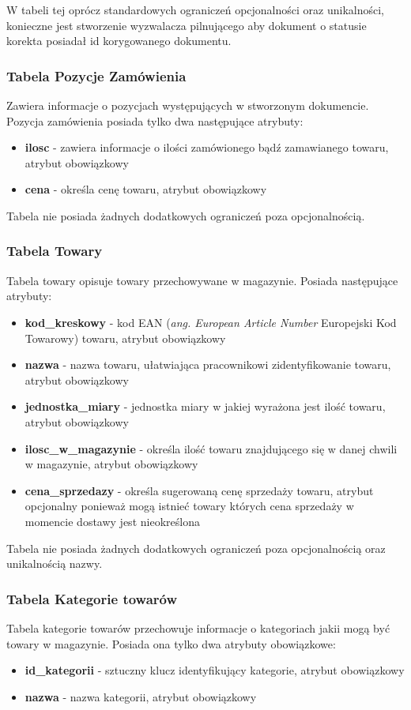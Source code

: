 W tabeli tej oprócz standardowych ograniczeń opcjonalności oraz unikalności,
konieczne jest stworzenie wyzwalacza pilnującego aby dokument o statusie korekta
posiadał id korygowanego dokumentu.

\subsubsection{Tabela Pozycje Zamówienia}
Zawiera informacje o pozycjach występujących w stworzonym dokumencie. Pozycja
zamówienia posiada tylko dwa następujące atrybuty:
\begin{itemize}
  \item \textbf{ilosc} - zawiera informacje o ilości zamówionego bądź
  zamawianego towaru, atrybut obowiązkowy
  \item \textbf{cena} - określa cenę towaru, atrybut obowiązkowy
\end{itemize} 

Tabela nie posiada żadnych dodatkowych ograniczeń poza opcjonalnością.

\subsubsection{Tabela Towary}
Tabela towary opisuje towary przechowywane w magazynie. Posiada następujące
atrybuty:
\begin{itemize}
  \item \textbf{kod\_kreskowy} - kod EAN (\textit{ang. European Article
  Number} Europejski Kod Towarowy) towaru, atrybut obowiązkowy
  \item \textbf{nazwa} - nazwa towaru, ułatwiająca pracownikowi zidentyfikowanie
  towaru, atrybut obowiązkowy
  \item \textbf{jednostka\_miary} - jednostka miary w jakiej wyrażona jest ilość
  towaru, atrybut obowiązkowy
  \item \textbf{ilosc\_w\_magazynie} - określa ilość towaru znajdującego się w
  danej chwili w magazynie, atrybut obowiązkowy
  \item \textbf{cena\_sprzedazy} - określa sugerowaną cenę sprzedaży towaru,
  atrybut opcjonalny ponieważ mogą istnieć towary których cena sprzedaży w
  momencie dostawy jest nieokreślona
\end{itemize}

Tabela nie posiada żadnych dodatkowych ograniczeń poza opcjonalnością oraz
unikalnością nazwy.

\subsubsection{Tabela Kategorie towarów}
Tabela kategorie towarów przechowuje informacje o  kategoriach jakii mogą być
towary w magazynie.
Posiada ona tylko dwa atrybuty obowiązkowe:
\begin{itemize}
  \item \textbf{id\_kategorii} - sztuczny klucz identyfikujący kategorie,
  atrybut obowiązkowy
  \item \textbf{nazwa} - nazwa kategorii, atrybut obowiązkowy
\end{itemize}

